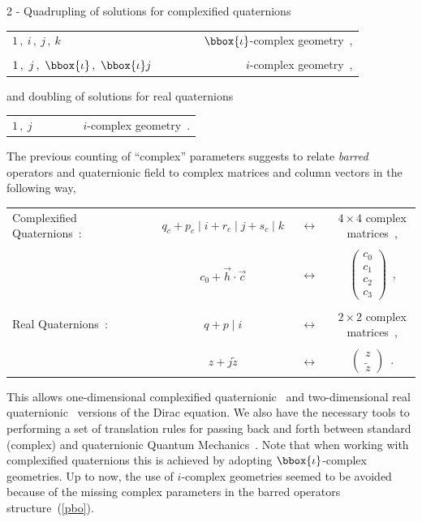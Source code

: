 2 - Quadrupling of solutions for complexified quaternions
\begin{center}
\begin{tabular}{lr}
$1 \, , ~ i \, , ~ j \, , ~ k$
& ~~~~~~~$\bbox{\iota}$-complex geometry~,\\
 & \\
$1 \, , ~ j \, , ~ \bbox{\iota} \, , ~ \bbox{\iota} j $
& ~~~~~~~$i$-complex geometry~,
\end{tabular}
\end{center}
and doubling of solutions for real quaternions
\begin{center}
\begin{tabular}{lr}
$1 \, , ~ j $
& ~~~~~~~$i$-complex geometry~.
\end{tabular}
\end{center}

The previous counting of ``complex'' parameters suggests to relate  
{\em barred} operators and quaternionic field to 
complex matrices and column vectors in the following way,
\begin{center}
\begin{tabular}{lccc}
Complexified Quaternions~:~~~~~~~~ &
$q_c + p_c \mid i + r_c \mid j + s_c \mid k $
& $~~\leftrightarrow ~~$ &
$4\times 4$ complex matrices~, \\
 &  & & \\
 & $c_0 + \vec{h} \cdot \vec{c} $
& $~~\leftrightarrow ~~$ &
$\left( \begin{array}{c} c_0\\ c_1 \\ c_2 \\ c_3 \end{array} \right)$~,\\
 & & & \\
Real Quaternions~: & $q + p \mid i $
& $~~\leftrightarrow ~~$ &
$2\times 2$ complex matrices~, \\
 & & & \\
 & $z + j \tilde{z} $
& $~~\leftrightarrow ~~$ &
$\left( \begin{array}{c} z\\ \tilde{z} \end{array} \right)$~.
\end{tabular}
\end{center}
This allows one-dimensional complexified quaternionic~\cite{D} and 
two-dimensional
real quaternionic~\cite{R} versions of the Dirac equation. 
We also have the necessary tools to performing a set of translation 
rules for passing back and forth between standard (complex) and quaternionic 
Quantum Mechanics~\cite{DR,T}.
Note that when working with complexified quaternions this is 
achieved by adopting 
$\bbox{\iota}$-complex geometries. Up to now, the use of $i$-complex 
geometries seemed to be avoided because of the missing complex parameters 
in the barred operators structure~(\ref{pbo}).




